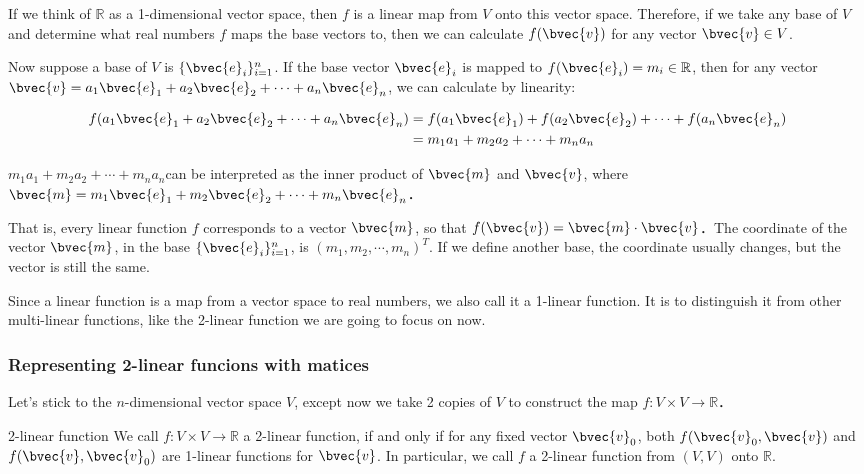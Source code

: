 If we think of $\mathbb{R}$ as a 1-dimensional vector space, then $f$ is a linear map from $V$ onto this vector space. Therefore, if we take any base of $V$ and determine what real numbers $f$ maps the base vectors to, then we can calculate $f(\bvec{v})$ for any vector $\bvec{v}\in V$. 

Now suppose a base of $V$ is $\{\bvec{e}_i\}^n_{i=1}$. If the base vector $\bvec{e}_i$ is mapped to $f(\bvec{e}_i)=m_i\in\mathbb{R}$, then for any vector $\bvec{v}=a_1\bvec{e}_1+a_2\bvec{e}_2+\cdots+a_n\bvec{e}_n$, we can calculate by linearity: 

\begin{equation}
\begin{aligned}
f(a_1\bvec{e}_1+a_2\bvec{e}_2+\cdots+a_n\bvec{e}_n)&=f(a_1\bvec{e}_1)+f(a_2\bvec{e}_2)+\cdots+f(a_n\bvec{e}_n)\\&=m_1a_1+m_2a_2+\cdots+m_na_n
\end{aligned}
\end{equation}


$m_1a_1+m_2a_2+\cdots+m_na_n$can be interpreted as the inner product of $\bvec{m}$ and $\bvec{v}$, where$\bvec{m}=m_1\bvec{e}_1+m_2\bvec{e}_2+\cdots+m_n\bvec{e}_n$．

That is, every linear function $f$ corresponds to a vector $\bvec{m}$, so that $f(\bvec{v})=\bvec{m}\cdot\bvec{v}$．The coordinate of the vector $\bvec{m}$, in the base $\{\bvec{e}_i\}_{i=1}^n$, is $(m_1, m_2, \cdots, m_n)^T$. If we define another base, the coordinate usually changes, but the vector is still the same. 

Since a linear function is a map from a vector space to real numbers, we also call it a 1-linear function. It is to distinguish it from other multi-linear functions, like the 2-linear function we are going to focus on now. 

\subsubsection{Representing 2-linear funcions with matices}

Let's stick to the $n$-dimensional vector space $V$, except now we take 2 copies of $V$ to construct the map $f:V\times V\rightarrow\mathbb{R}$．

\begin{definition}{2-linear function}
We call $f:V\times V\rightarrow\mathbb{R}$ a 2-linear function, if and only if for any fixed vector $\bvec{v}_0$, both $f(\bvec{v}_0, \bvec{v})$ and $f(\bvec{v}, \bvec{v}_0)$ are 1-linear functions for $\bvec{v}$. In particular, we call $f$ a 2-linear function from $(V, V)$ onto $\mathbb{R}$. 
\end{definition}


